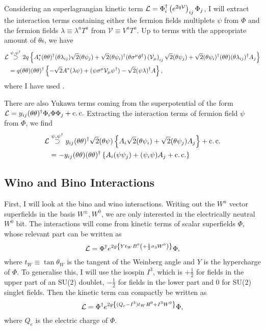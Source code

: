\documentclass[../main.tex]{subfiles}
\begin{document}
Considering an superlagrangian kinetic term \(\mathcal{L} = \Phi^\dagger_i
\left(e^{2q \mathcal{V}}\right)_{ij} \Phi_j\), I will extract the interaction
terms containing either the fermion fields multiplets \(\psi\) from \(\Phi\)
and the fermion fields \(\lambda \equiv \lambda^a T^a\) from \(\mathcal{V}
\equiv V^a T^a\). Up to terms with the appropriate amount of \(\theta\)s, we
have
\begin{align}
  \label{susy:eq:psi_kin_int}
  \nonumber
  \mathcal{L} & \stackrel{\psi, \psi^\dagger}{\supset} 2q \left\{ A^\ast_i (\theta\theta)^\dagger (\theta\lambda_{ij}) \sqrt{2} (\theta\psi_j) + \sqrt{2} (\theta\psi_i)^\dagger (\theta\sigma^\mu\theta^\dagger) \left(\mathcal{V}_\mu\right)_{ij} \sqrt{2} (\theta\psi_j) + \sqrt{2} (\theta\psi_i)^\dagger (\theta\theta) (\theta\lambda_{ij})^\dagger A_j \right\} \\
     & = q(\theta\theta)(\theta\theta)^\dagger \left\{ -\sqrt{2} A^\ast (\lambda\psi) + (\psi \sigma^\mu \mathcal{V}_\mu \psi^\dagger) - \sqrt{2} (\psi\lambda)^\dagger A \right\},
\end{align}
where I have used . 
\medskip

There are also Yukawa terms coming from the superpotential of the form \(\mathcal{L} =
y_{ij} (\theta\theta)^\dagger \Phi_i \Phi \Phi_j + \operatorname{c.c.}\) Extracting the
interaction terms of fermion field \(\psi\) from \(\Phi\), we find
\begin{align}
  \label{susy:eq:psi_yuk_int}
  \nonumber
  \mathcal{L} & \stackrel{\psi, \psi^\dagger}{\supset} y_{ij} (\theta\theta)^\dagger \sqrt{2} (\theta\psi) \left\{ A_i \sqrt{2}(\theta\psi_i) + \sqrt{2}(\theta\psi_j)A_j \right\} + \operatorname{c.c.} \\
     & = -y_{ij} (\theta\theta)(\theta\theta)^\dagger \left\{ A_i(\psi\psi_j) + (\psi_i\psi)A_j + \operatorname{c.c.} \right\}
\end{align}

\subsection{Wino and Bino Interactions}
First, I will look at the bino and wino interactions. Writing out the \(W^a\)
vector superfields in the basis \(W^\pm, W^0\), we are only interested in the
electrically neutral \(W^0\) bit. The interactions will come from kinetic terms
of scalar superfields \(\Phi\), whose relevant part can be written as
\begin{equation}
  \mathcal{L} = \Phi^\dagger e^{2g\left\{Y t_W B^0 \left(+ \frac{1}{2}\sigma_3 W^0\right)\right\}} \Phi,
\end{equation}
where \(t_W \equiv \tan\theta_W\) is the tangent of the Weinberg angle and \(Y\) is the hypercharge of \(\Phi\).
To generalise this, I will use the isospin \(I^3\), which is \(+\frac{1}{2}\) for fields in the upper part of an SU(2) doublet, \(-\frac{1}{2}\) for fields in the lower part and 0 for SU(2) singlet fields.
Then the kinetic term can compactly be written as
\begin{equation}
  \mathcal{L} = \Phi^\dagger e^{2g\left\{(Q_e - I^3) t_W B^0 + I^3 W^0\right\}} \Phi,
\end{equation}
where \(Q_e\) is the electric charge of \(\Phi\).
\medskip
\end{document}

